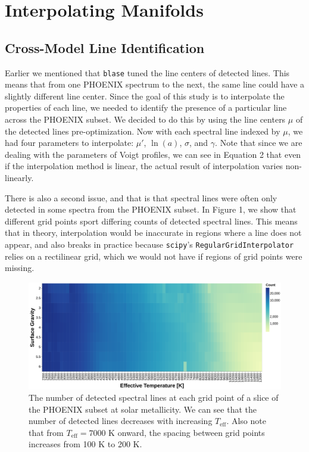 \documentclass[twocolumn]{aastex631}
\begin{document}
\section{Interpolating Manifolds}
\subsection{Cross-Model Line Identification}
Earlier we mentioned that \texttt{blase} tuned the line centers of
detected lines. This means that from one PHOENIX spectrum to the next, the
same line could have a slightly different line center. Since the goal of this
study is to interpolate the properties of each line, we needed to identify the
presence of a particular line across the PHOENIX subset. We decided to do
this by using the line centers $\mu$ of the detected lines pre-optimization. 
Now with each spectral line indexed by $\mu$, we had four parameters to interpolate:
$\mu'$, $\ln(a)$, $\sigma$, and $\gamma$. Note that since we are dealing with 
the parameters of Voigt profiles, we can see in Equation 2 that even if the 
interpolation method is linear, the actual result of interpolation varies 
non-linearly.

There is also a second issue, and that is that spectral lines were often
only detected in some spectra from the PHOENIX subset. In Figure 1, we show
that different grid points sport differing counts of detected spectral lines.
This means that in theory, interpolation would be inaccurate in regions where 
a line does not appear, and also breaks in practice because \texttt{scipy}'s 
\texttt{RegularGridInterpolator} relies on a rectilinear grid, which we would not 
have if regions of grid points were missing. 

\begin{figure}[t!]
    \centering
    \includegraphics[width=\textwidth]{images/figure1.png}
    \caption{The number of detected spectral lines at each grid point of 
    a slice of the PHOENIX subset at solar metallicity. We can see that
    the number of detected lines decreases with increasing $T_{\mathrm{eff}}$.
    Also note that from $T_{\mathrm{eff}} = 7000$ K onward, the spacing 
    between grid points increases from 100 K to 200 K.}
\end{figure}
\end{document}
